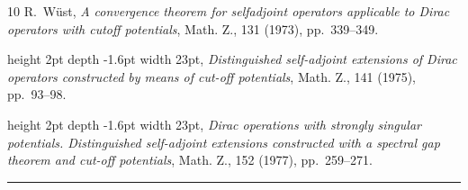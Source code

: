 \documentclass[12pt,reqno]{amsart}
\renewcommand{\(}{\left(}
\renewcommand{\)}{\right)}
\begin{document}
\begin{thebibliography}{10}
{\sc R.~W{\"u}st}, {\em A convergence theorem for selfadjoint operators
  applicable to {D}irac operators with cutoff potentials}, Math. Z., 131
  (1973), pp.~339--349.

\leavevmode\vrule height 2pt depth -1.6pt width 23pt, {\em Distinguished
  self-adjoint extensions of {D}irac operators constructed by means of cut-off
  potentials}, Math. Z., 141 (1975), pp.~93--98.

\leavevmode\vrule height 2pt depth -1.6pt width 23pt, {\em Dirac operations
  with strongly singular potentials. {D}istinguished self-adjoint extensions
  constructed with a spectral gap theorem and cut-off potentials}, Math. Z.,
  152 (1977), pp.~259--271.

\end{thebibliography}
\bigskip\begin{center}\rule{2cm}{0.5pt}\end{center}\bigskip
\end{document}
